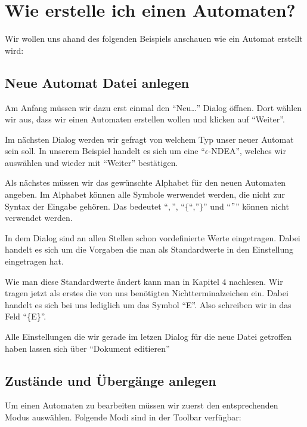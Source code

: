 \chapter{Wie erstelle ich einen Automaten?}

Wir wollen uns ahand des folgenden Beispiels anschauen wie ein Automat erstellt
wird:\vspace{10pt}

\section{Neue Automat Datei anlegen}

Am Anfang müssen wir dazu erst einmal den "`Neu\ldots"' Dialog öffnen. Dort
wählen wir aus, dass wir einen Automaten erstellen wollen und klicken
auf "`Weiter"'.\vspace{10pt}

Im nächsten Dialog werden wir gefragt von welchem Typ unser neuer
Automat sein soll. In unserem Beispiel handelt es sich um eine
"`$\epsilon$-NDEA"', welches wir auswählen und wieder mit "`Weiter"'
bestätigen.\vspace{10pt}

Als nächstes müssen wir das gewünschte Alphabet für den neuen Automaten
angeben. Im Alphabet können alle Symbole werwendet werden, die nicht zur Syntax
der Eingabe gehören. Das bedeutet "`$,$"', "`$\{$"`,"'$\}$"' und "`$"$"' können nicht verwendet
werden.\vspace{10pt}

In dem Dialog sind an allen Stellen schon vordefinierte Werte eingetragen.
Dabei handelt es sich um die Vorgaben die man als Standardwerte in den Einstellung eingetragen hat.

Wie man diese Standardwerte ändert kann man in Kapitel $4$ nachlesen. Wir tragen
jetzt als erstes die von uns benötigten Nichtterminalzeichen ein. Dabei handelt
es sich bei uns lediglich um das Symbol "`E"'. Also schreiben wir in das Feld
"`\{E\}"'.\vspace{10pt}

Alle Einstellungen die wir gerade im letzen Dialog für die neue Datei
getroffen haben lassen sich über "`Dokument editieren"'

\section{Zustände und Übergänge anlegen}

Um einen Automaten zu bearbeiten müssen wir zuerst den entsprechenden Modus
auswählen. Folgende Modi sind in der Toolbar verfügbar:

